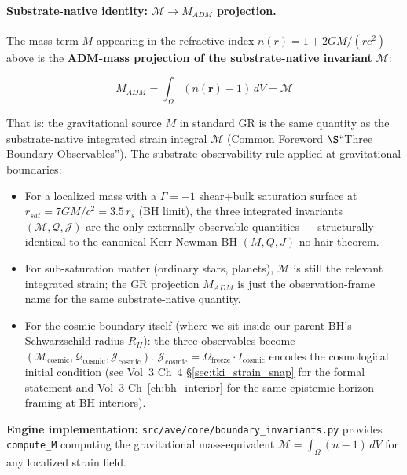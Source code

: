 \paragraph{Substrate-native identity: $\mathcal{M} \to M_{ADM}$ projection.}
The mass term $M$ appearing in the refractive index $n(r) = 1 + 2GM/(rc^2)$ above is
the \textbf{ADM-mass projection of the substrate-native invariant} $\mathcal{M}$:

\begin{equation}
M_{ADM} = \int_\Omega (n(\mathbf{r}) - 1)\, dV = \mathcal{M}
\label{eq:M_to_M_ADM}
\end{equation}

That is: the gravitational source $M$ in standard GR is the same quantity as
the substrate-native integrated strain integral $\mathcal{M}$ (Common Foreword
$\S$``Three Boundary Observables''). The substrate-observability rule applied
at gravitational boundaries:

\begin{itemize}\itemsep 0pt
\item For a localized mass with a $\Gamma = -1$\gammaundeclared{} shear+bulk saturation surface at
  $r_{sat} = 7GM/c^2 = 3.5\,r_s$ (BH limit), the three integrated invariants
  $(\mathcal{M}, \mathcal{Q}, \mathcal{J})$ are the only externally observable
  quantities --- structurally identical to the canonical Kerr-Newman BH
  $(M, Q, J)$ no-hair theorem.
\item For sub-saturation matter (ordinary stars, planets), $\mathcal{M}$ is still
  the relevant integrated strain; the GR projection $M_{ADM}$ is just the
  observation-frame name for the same substrate-native quantity.
\item For the cosmic boundary itself (where we sit inside our parent BH's
  Schwarzschild radius $R_H$): the three observables become
  $(\mathcal{M}_{\text{cosmic}}, \mathcal{Q}_{\text{cosmic}}, \mathcal{J}_{\text{cosmic}})$.
  $\mathcal{J}_{\text{cosmic}} = \Omega_{\text{freeze}} \cdot I_{\text{cosmic}}$ encodes
  the cosmological initial condition (see Vol~3 Ch~4 \S\ref{sec:tki_strain_snap}
  for the formal statement and Vol~3 Ch~\ref{ch:bh_interior} for the
  same-epistemic-horizon framing at BH interiors).
\end{itemize}

\textbf{Engine implementation:} \texttt{src/ave/core/boundary\_invariants.py}
provides \texttt{compute\_M} computing the gravitational mass-equivalent
$\mathcal{M} = \int_\Omega (n - 1)\, dV$ for any localized strain field.

